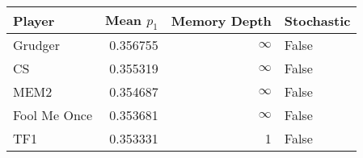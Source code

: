 \begin{tabular}{lrrl}
\toprule
       Player &  Mean $p_1$ &  Memory Depth & Stochastic \\
\midrule
      Grudger &    0.356755 &            \(\infty\) &      False \\
           CS &    0.355319 &            \(\infty\) &      False \\
         MEM2 &    0.354687 &            \(\infty\) &      False \\
 Fool Me Once &    0.353681 &            \(\infty\) &      False \\
          TF1 &    0.353331 &             1 &      False \\
\bottomrule
\end{tabular}
